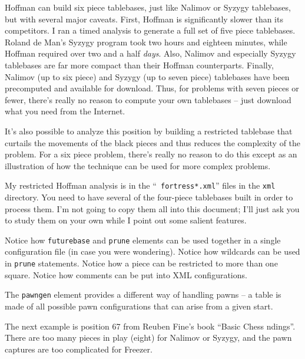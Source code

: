 \documentclass[11pt]{article}
\begin{document}
Hoffman can build six piece tablebases, just like Nalimov or Syzygy
tablebases, but with several major caveats.  First, Hoffman is
significantly slower than its competitors.  I ran a timed analysis to
generate a full set of five piece tablebases.  Roland de Man's Syzygy
program took two hours and eighteen minutes, while Hoffman required
over two and a half {\it days}.  Also, Nalimov and especially Syzygy
tablebases are far more compact than their Hoffman counterparts.
Finally, Nalimov (up to six piece) and Syzygy (up to seven piece)
tablebases have been precomputed and available for download.  Thus,
for problems with seven pieces or fewer, there's really no reason to
compute your own tablebases -- just download what you need from the
Internet.

It's also possible to analyze this position by building a restricted
tablebase that curtails the movements of the black pieces and thus
reduces the complexity of the problem.  For a six piece problem,
there's really no reason to do this except as an illustration of how
the technique can be used for more complex problems.

My restricted Hoffman analysis is in the ``{\tt
  fortress*.xml}'' files in the {\tt xml} directory.  You need to have
several of the four-piece tablebases built in order to process them.
I'm not going to copy them all into this document; I'll just ask you
to study them on your own while I point out some salient features.

Notice how {\tt futurebase} and {\tt prune} elements can be used
together in a single configuration file (in case you were wondering).
Notice how wildcards can be used in {\tt prune} statements.  Notice
how a piece can be restricted to more than one square.  Notice how
comments can be put into XML configurations.

The {\tt pawngen} element provides a different way of handling pawns
-- a table is made of all possible pawn configurations that can
arise from a given start.

The next example is position 67 from Reuben Fine's book ``Basic Chess
ndings''.  There are too many pieces in play (eight) for Nalimov or
Syzygy, and the pawn captures are too complicated for Freezer.

\showboard
\end{document}
